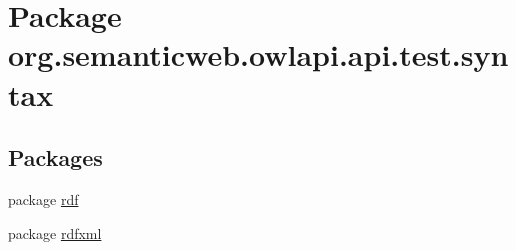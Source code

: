 \hypertarget{namespaceorg_1_1semanticweb_1_1owlapi_1_1api_1_1test_1_1syntax}{\section{Package org.\-semanticweb.\-owlapi.\-api.\-test.\-syntax}
\label{namespaceorg_1_1semanticweb_1_1owlapi_1_1api_1_1test_1_1syntax}
}
\subsection*{Packages}
\begin{DoxyCompactItemize}
\item 
package \hyperlink{namespaceorg_1_1semanticweb_1_1owlapi_1_1api_1_1test_1_1syntax_1_1rdf}{rdf}
\item 
package \hyperlink{namespaceorg_1_1semanticweb_1_1owlapi_1_1api_1_1test_1_1syntax_1_1rdfxml}{rdfxml}
\end{DoxyCompactItemize}
